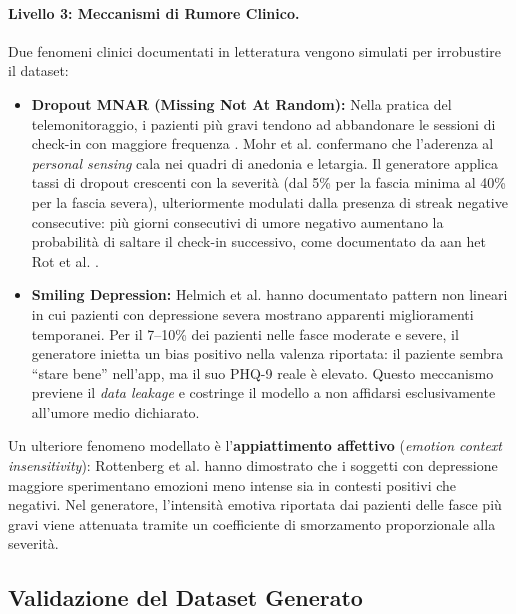 \paragraph{Livello 3: Meccanismi di Rumore Clinico.}
Due fenomeni clinici documentati in letteratura vengono simulati per irrobustire il dataset:

\begin{itemize}
    \item \textbf{Dropout MNAR (Missing Not At Random):} Nella pratica del telemonitoraggio, i pazienti più gravi tendono ad abbandonare le sessioni di check-in con maggiore frequenza \cite{karyotaki2015dropout}. Mohr et al. \cite{mohr2017personal} confermano che l'aderenza al \textit{personal sensing} cala nei quadri di anedonia e letargia. Il generatore applica tassi di dropout crescenti con la severità (dal 5\% per la fascia minima al 40\% per la fascia severa), ulteriormente modulati dalla presenza di streak negative consecutive: più giorni consecutivi di umore negativo aumentano la probabilità di saltare il check-in successivo, come documentato da aan het Rot et al. \cite{aanhetrot2012ema}.

    \item \textbf{Smiling Depression:} Helmich et al. \cite{helmich2020smiling} hanno documentato pattern non lineari in cui pazienti con depressione severa mostrano apparenti miglioramenti temporanei. Per il 7--10\% dei pazienti nelle fasce moderate e severe, il generatore inietta un bias positivo nella valenza riportata: il paziente sembra ``stare bene'' nell'app, ma il suo PHQ-9 reale è elevato. Questo meccanismo previene il \textit{data leakage} e costringe il modello a non affidarsi esclusivamente all'umore medio dichiarato.
\end{itemize}

Un ulteriore fenomeno modellato è l'\textbf{appiattimento affettivo} (\textit{emotion context insensitivity}): Rottenberg et al. \cite{rottenberg2005mood} hanno dimostrato che i soggetti con depressione maggiore sperimentano emozioni meno intense sia in contesti positivi che negativi. Nel generatore, l'intensità emotiva riportata dai pazienti delle fasce più gravi viene attenuata tramite un coefficiente di smorzamento proporzionale alla severità.

\subsection{Validazione del Dataset Generato}
\label{subsec:validazione_sintetico}

